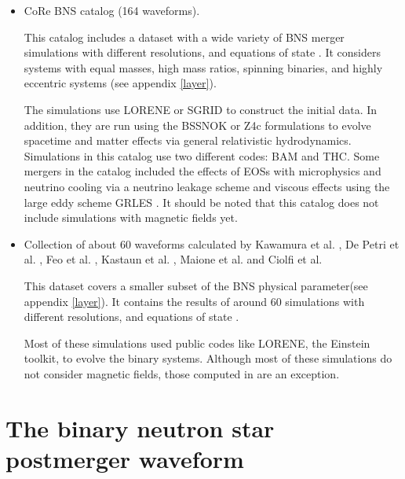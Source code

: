 \begin{itemize}

\item CoRe BNS catalog (164 waveforms).

This catalog includes a dataset with a wide variety of BNS merger simulations with different resolutions, and equations of state \cite{Banik_2014,Steiner:2012rk,PhysRevD.79.124032}. It considers systems with equal masses, high mass ratios, spinning binaries, and highly eccentric systems (see appendix \ref{layer}).

The simulations use LORENE or SGRID to construct the initial data. In addition, they are run using the BSSNOK \cite{PhysRevD.52.5428,1987PThPS..90....1N,Bernuzzi_2010} or Z4c \cite{Ruiz_2011,Weyhausen_2012,Hilditch_2013} formulations to evolve spacetime and matter effects via general relativistic hydrodynamics. Simulations in this catalog use two different codes: BAM and THC. Some mergers in the catalog included the effects of EOSs with microphysics and neutrino cooling via a neutrino leakage scheme and viscous effects using the large eddy scheme GRLES \cite{Radice_2017}. It should be noted that this catalog does not include simulations with magnetic fields yet.

\item Collection of about 60 waveforms calculated by Kawamura et al. \cite{Kawamura:2016nmk}, De Petri et al. \cite{DePietri:2018tpx,DePietri:2015lya}, Feo et al. \cite{Feo:2016cbs}, Kastaun et al. \cite{Kastaun:2016elu}, Maione et al. \cite{Maione:2016zqz,Maione:2017aux} and Ciolfi et al. \cite{Ciolfi:2017uak}

This dataset covers a smaller subset of the BNS physical parameter(see appendix \ref{layer}). It contains the results of around 60 simulations with different resolutions, and equations of state \cite{PhysRevC.82.015806,PhysRevC.83.035802,PhysRevC.58.1804,PhysRevD.79.124032,PhysRevLett.67.2414,PhysRevC.52.2072}.

Most of these simulations used public codes like LORENE, the Einstein toolkit, to evolve the binary systems. Although most of these simulations do not consider magnetic fields, those computed in \cite{Kawamura:2016nmk,Ciolfi:2017uak} are an exception. 

\end{itemize}



\section{The binary neutron star postmerger waveform}

